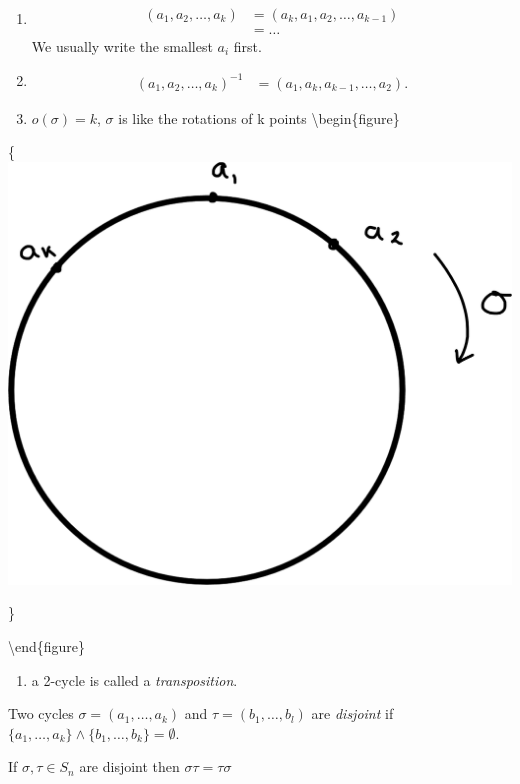 \begin{remark}

~

\begin{enumerate}
\def\labelenumi{\roman{enumi}.}
\item
  \begin{align*}
   (a_1, a_2, \ldots, a_k) &= (a_k, a_1, a_2, \ldots, a_{k-1}) \\
   &= \ldots
  \end{align*} We usually write the smallest \(a_i\) first.
\item
  \begin{align*}
  (a_1, a_2, \ldots, a_k)^{-1} &= (a_1, a_k, a_{k-1}, \ldots, a_2).
  \end{align*}
\item
  \(o(\sigma) = k\), \(\sigma\) is like the rotations of k points
  \textbackslash begin\{figure\}
\end{enumerate}

\{\centering \includegraphics[width=0.5\linewidth]{figures/02-sigma-graphical}

\}

\textbackslash end\{figure\}

\begin{enumerate}
\def\labelenumi{\roman{enumi}.}
\setcounter{enumi}{3}
\tightlist
\item
  a 2-cycle is called a \emph{transposition}.
\end{enumerate}

\end{remark}

\begin{definition}
Two cycles \(\sigma = (a_1, \ldots, a_k)\) and \(\tau = (b_1, \ldots, b_l)\) are \emph{disjoint} if \(\{ a_1, \ldots, a_k \} \land \{ b_1, \ldots, b_k \} = \emptyset\).
\end{definition}

\begin{lemma}
\protect\hypertarget{lem:six}{}\label{lem:six}If \(\sigma, \tau \in S_n\) are disjoint then \(\sigma \tau = \tau \sigma\)
\end{lemma}

